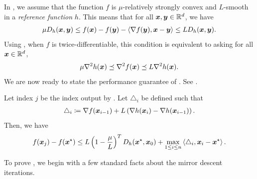 In , we assume that the function $f$ is $\mu$-relatively strongly convex and $L$-smooth in a \textit{reference function} $h$. This means that for all $\bm{x},\bm{y}\in\mathbb{R}^d$, we have
\begin{align*}
    \mu D_h(\bm{x},\bm{y}) \le f(\bm{x}) - f(\bm{y}) - \left\langle \nabla f(\bm{y}), \bm{x}-\bm{y} \right\rangle \le  LD_h(\bm{x},\bm{y}).
\end{align*}
Using \cite[Proposition 1.1]{lfn18}, when $f$ is twice-differentiable, this condition is equivalent to asking for all $\bm{x}\in\mathbb{R}^d$, 
\begin{align*}
    \mu \nabla^2 h(\bm{x}) \preceq \nabla^2 f(\bm{x}) \preceq L\nabla^2 h(\bm{x}).
\end{align*}
We are now ready to state the performance guarantee of . See .

\begin{theorem}
\label{thm:gp_mirror_descent}
Let index $j$ be the index output by . Let $\triangle_i$ be defined such that
\begin{align*}
    \triangle_i \coloneqq \nabla f(\bm{x}_{i-1}) + L\left(\nabla h(\bm{x}_i) - \nabla h(\bm{x}_{i-1})\right).
\end{align*}
Then, we have
\begin{align*}
    f(\bm{x}_j)-f(\bm{x}^{\star}) \le L\left(1-\frac{\mu}{L}\right)^TD_h(\bm{x}^{\star},\bm{x}_0)+\max_{1\le i \le n}\left\langle \triangle_i,\bm{x}_i-\bm{x}^{\star} \right\rangle.
\end{align*}
\end{theorem}

To prove , we begin with a few standard facts about the mirror descent iterations.

